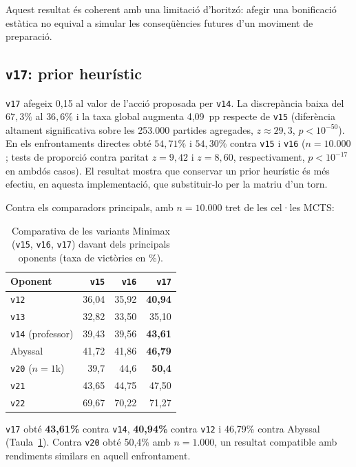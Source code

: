 Aquest resultat és coherent amb una limitació d'horitzó: afegir una bonificació estàtica no equival a simular les conseqüències futures d'un moviment de preparació.

\subsection{\texttt{v17}: prior heurístic}

\texttt{v17} afegeix 0,15 al valor de l'acció proposada per \texttt{v14}. La discrepància baixa del $67{,}3\%$ al $36{,}6\%$ i la taxa global augmenta 4,09~pp respecte de \texttt{v15} (diferència altament significativa sobre les 253.000 partides agregades, $z \approx 29{,}3$, $p < 10^{-50}$). En els enfrontaments directes obté $54{,}71\%$ i $54{,}30\%$ contra \texttt{v15} i \texttt{v16} ($n=10.000$; tests de proporció contra paritat $z = 9{,}42$ i $z = 8{,}60$, respectivament, $p < 10^{-17}$ en ambdós casos). El resultat mostra que conservar un prior heurístic és més efectiu, en aquesta implementació, que substituir-lo per la matriu d'un torn.

Contra els comparadors principals, amb $n=10.000$ tret de les cel·les MCTS:

\begin{table}[htbp]
\centering
\small
\caption{Comparativa de les variants Minimax (\texttt{v15}, \texttt{v16}, \texttt{v17}) davant dels principals oponents (taxa de victòries en \%).}
\label{tab:minimax_comparators}
\begin{tabular}{lrrr}
\toprule
Oponent & \texttt{v15} & \texttt{v16} & \texttt{v17} \\
\midrule
\texttt{v12} & 36,04 & 35,92 & \textbf{40,94} \\
\texttt{v13} & 32,82 & 33,50 & 35,10 \\
\texttt{v14} (professor) & 39,43 & 39,56 & \textbf{43,61} \\
Abyssal & 41,72 & 41,86 & \textbf{46,79} \\
\texttt{v20} ($n=1$k) & 39,7 & 44,6 & \textbf{50,4} \\
\texttt{v21} & 43,65 & 44,75 & 47,50 \\
\texttt{v22} & 69,67 & 70,22 & 71,27 \\
\bottomrule
\end{tabular}
\end{table}

\texttt{v17} obté \textbf{43,61\%} contra \texttt{v14}, \textbf{40,94\%} contra \texttt{v12} i 46,79\% contra Abyssal (Taula~\ref{tab:minimax_comparators}). Contra \texttt{v20} obté 50,4\% amb $n=1.000$, un resultat compatible amb rendiments similars en aquell enfrontament.


